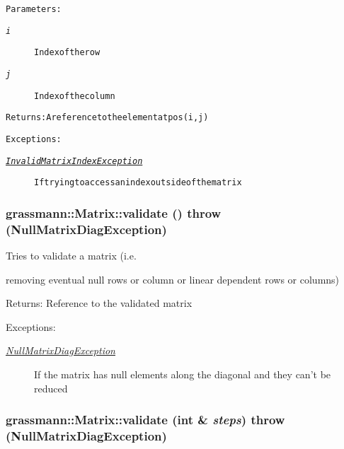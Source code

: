 \small\begin{alltt} \begin{Desc}
\item[Parameters:]
\begin{description}
\item[{\em i}]Index of the row
 \item[{\em j}]Index of the column
 \end{description}
\end{Desc}
\begin{Desc}
\item[Returns:]A reference to the element at pos (i,j)
 \end{Desc}
\begin{Desc}
\item[Exceptions:]
\begin{description}
\item[{\em \hyperlink{classgrassmann_1_1InvalidMatrixIndexException}{InvalidMatrixIndexException}}]If trying to access an index outside of the matrix
\end{description}
\end{Desc}
\end{alltt}
\normalsize 
\hypertarget{classgrassmann_1_1Matrix_ebdbbb13e0261f2c1af0f049e28adf89}{
\subsubsection[validate]{ grassmann::Matrix::validate ()  throw ({\bf NullMatrixDiagException})}}
\label{classgrassmann_1_1Matrix_ebdbbb13e0261f2c1af0f049e28adf89}


Tries to validate a matrix (i.e. 

removing eventual null rows or column or linear dependent rows or columns) \begin{Desc}
\item[Returns:]Reference to the validated matrix \end{Desc}
\begin{Desc}
\item[Exceptions:]
\begin{description}
\item[{\em \hyperlink{classgrassmann_1_1NullMatrixDiagException}{NullMatrixDiagException}}]If the matrix has null elements along the diagonal and they can't be reduced \end{description}
\end{Desc}
\hypertarget{classgrassmann_1_1Matrix_12e27a7a60f30c44f36263151b367774}{
\subsubsection[validate]{ grassmann::Matrix::validate (int \& {\em steps})  throw ({\bf NullMatrixDiagException})}}
\label{classgrassmann_1_1Matrix_12e27a7a60f30c44f36263151b367774}


